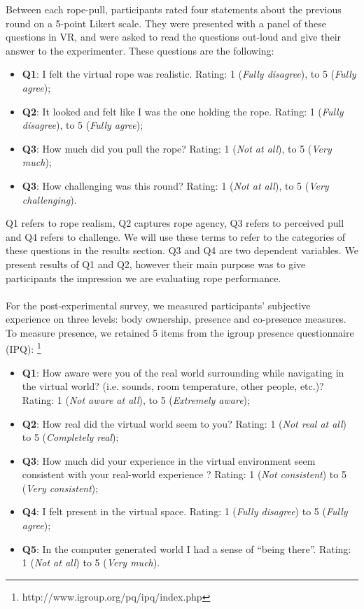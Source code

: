 Between each rope-pull, participants rated four statements about the previous round on a 5-point Likert scale. They were presented with a panel of these questions in VR, and were asked to read the questions out-loud and give their answer to the experimenter. These questions are the following:
\begin{itemize}
\label{enum:panelQuestions}
\itemsep0em
\item \textbf{Q1}: I felt the virtual rope was realistic. Rating: 1 (\textit{Fully disagree}), to 5 (\textit{Fully agree});
\item \textbf{Q2}: It looked and felt like I was the one holding the rope. Rating: 1 (\textit{Fully disagree}), to 5 (\textit{Fully agree});
 \item \textbf{Q3}: How much did you pull the rope? Rating: 1 (\textit{Not at all}), to 5 (\textit{Very much});
\item \textbf{Q3}: How challenging was this round? Rating: 1 (\textit{Not at all}), to 5 (\textit{Very challenging}).
\end{itemize}
Q1 refers to rope realism, Q2 captures rope agency, Q3 refers to perceived pull and Q4 refers to challenge. We will use these terms to refer to the categories of these questions in the results section. Q3 and Q4 are two dependent variables. We present results of Q1 and Q2, however their main purpose was to give participants the impression we are evaluating rope performance.\\
\\
For the post-experimental survey, we measured participants' subjective experience on three levels: body ownership, presence and co-presence measures. 
To measure presence, we retained 5 items from the igroup presence questionnaire (IPQ): \footnote{http://www.igroup.org/pq/ipq/index.php}
\begin{itemize}
\label{enum:presenceQuestions}
\itemsep0em
    \item \textbf{Q1}: How aware were you of the real world surrounding while navigating in the virtual world? (i.e. sounds, room temperature, other people, etc.)? Rating: 1 (\textit{Not aware at all}), to 5 (\textit{Extremely aware});
    \item \textbf{Q2}: How real did the virtual world seem to you? Rating: 1 (\textit{Not real at all}) to 5 (\textit{Completely real});
    \item \textbf{Q3}: How much did your experience in the virtual environment seem consistent with your real-world experience ?  Rating: 1 (\textit{Not consistent}) to 5 (\textit{Very consistent});
    \item \textbf{Q4}: I felt present in the virtual space. Rating: 1 (\textit{Fully disagree}) to 5 (\textit{Fully agree});
    \item \textbf{Q5}: In the computer generated world I had a sense of ``being there''.  Rating: 1 (\textit{Not at all}) to 5 (\textit{Very much}). 
\end{itemize}
